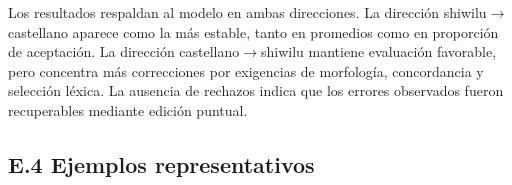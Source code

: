 \documentclass[12pt,a4paper,oneside]{book}
\begin{document}
\begin{table}[h]
\centering
\caption{Síntesis de la validación participativa del sistema.}
\label{tab:anexo-validacion-resultados}
\end{table}

Los resultados respaldan al modelo en ambas direcciones. La dirección shiwilu\(\rightarrow\)castellano aparece como la más estable, tanto en promedios como en proporción de aceptación. La dirección castellano\(\rightarrow\)shiwilu mantiene evaluación favorable, pero concentra más correcciones por exigencias de morfología, concordancia y selección léxica. La ausencia de rechazos indica que los errores observados fueron recuperables mediante edición puntual.

\subsection*{E.4 Ejemplos representativos}
\end{document}
